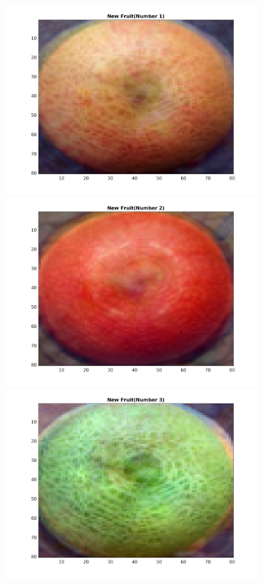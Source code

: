 \documentclass[12pt, a4paper]{article}
\begin{document}
\noindent\includegraphics[width=0.7\textwidth, height = 0.25\paperheight]{New_Fruit_Creation_1}\\
\includegraphics[width=0.7\textwidth, height = 0.25\paperheight]{New_Fruit_Creation_2}\\
\includegraphics[width=0.7\textwidth, height = 0.25\paperheight]{New_Fruit_Creation_3}\\
\end{document}
